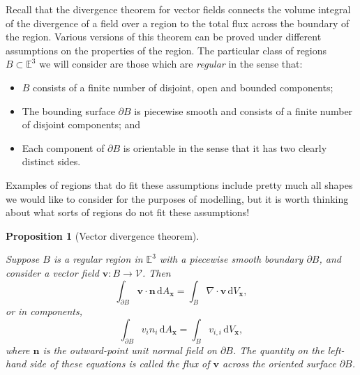 \documentclass[
  letterpaper,
  DIV=11,
  numbers=noendperiod]{scrreprt}
\theoremstyle{plain}
\newtheorem{proposition}{Proposition}[chapter]
\theoremstyle{remark}
\begin{document}
Recall that the divergence theorem for vector fields connects the volume
integral of the divergence of a field over a region to the total flux
across the boundary of the region. Various versions of this theorem can
be proved under different assumptions on the properties of the region.
The particular class of regions \(B\subset{\mathbb{E}}^3\) we will
consider are those which are \emph{regular} in the sense that:

\begin{itemize}
\item
  \(B\) consists of a finite number of disjoint, open and bounded
  components;
\item
  The bounding surface \(\partial B\) is piecewise smooth and consists
  of a finite number of disjoint components; and
\item
  Each component of \(\partial B\) is orientable in the sense that it
  has two clearly distinct sides.
\end{itemize}

Examples of regions that do fit these assumptions include pretty much
all shapes we would like to consider for the purposes of modelling, but
it is worth thinking about what sorts of regions do not fit these
assumptions!

\begin{proposition}[Vector divergence
theorem]\protect\hypertarget{prp-vectordivtheorem}{}\label{prp-vectordivtheorem}

Suppose \(B\) is a regular region in \({\mathbb{E}}^3\) with a piecewise
smooth boundary \(\partial B\), and consider a vector field
\({\boldsymbol{v}}:B\to{\mathcal{V}}\). Then
\[\int_{\partial B} {\boldsymbol{v}}\cdot{\boldsymbol{n}}{\,{\mathrm{d}}A_{{\boldsymbol{x}}}}= \int_B\nabla\cdot{\boldsymbol{v}}{\,{\mathrm{d}}V_{{\boldsymbol{x}}}},\]
or in components,
\[\int_{\partial B}v_in_i {\,{\mathrm{d}}A_{{\boldsymbol{x}}}}= \int_Bv_{i,i} {\,{\mathrm{d}}V_{{\boldsymbol{x}}}},\]
where \({\boldsymbol{n}}\) is the outward-point unit normal field on
\(\partial B\). The quantity on the left-hand side of these equations is
called the \emph{flux} of \({\boldsymbol{v}}\) across the oriented
surface \(\partial B\).

\end{proposition}
\end{document}
